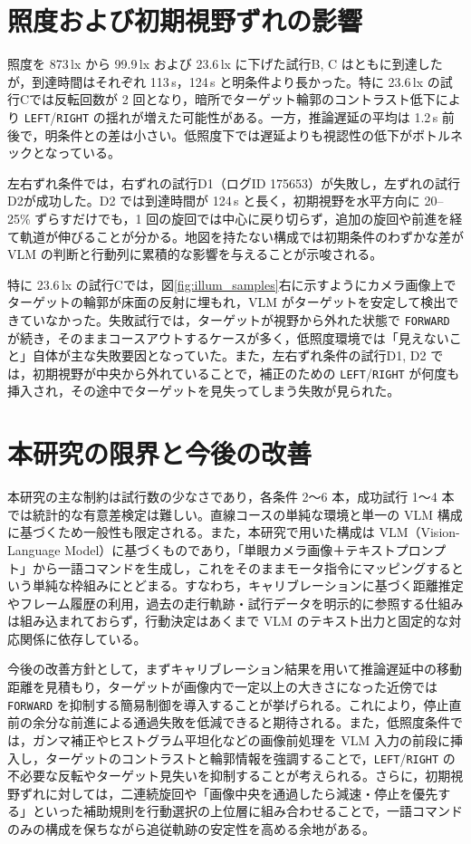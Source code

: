 \documentclass[a4paper,11pt]{ltjsreport}
\begin{document}
\section{照度および初期視野ずれの影響}
照度を 873\,lx から 99.9\,lx および 23.6\,lx に下げた試行B, C はともに到達したが，到達時間はそれぞれ 113\,s，124\,s と明条件より長かった。特に 23.6\,lx の試行Cでは反転回数が 2 回となり，暗所でターゲット輪郭のコントラスト低下により \texttt{LEFT}/\texttt{RIGHT} の揺れが増えた可能性がある。一方，推論遅延の平均は 1.2\,s 前後で，明条件との差は小さい。低照度下では遅延よりも視認性の低下がボトルネックとなっている。

左右ずれ条件では，右ずれの試行D1（ログID 175653）が失敗し，左ずれの試行D2が成功した。D2 では到達時間が 124\,s と長く，初期視野を水平方向に 20--25\% ずらすだけでも，1 回の旋回では中心に戻り切らず，追加の旋回や前進を経て軌道が伸びることが分かる。地図を持たない構成では初期条件のわずかな差が VLM の判断と行動列に累積的な影響を与えることが示唆される。

特に 23.6\,lx の試行Cでは，図\ref{fig:illum_samples}右に示すようにカメラ画像上でターゲットの輪郭が床面の反射に埋もれ，VLM がターゲットを安定して検出できていなかった。失敗試行では，ターゲットが視野から外れた状態で \texttt{FORWARD} が続き，そのままコースアウトするケースが多く，低照度環境では「見えないこと」自体が主な失敗要因となっていた。また，左右ずれ条件の試行D1, D2 では，初期視野が中央から外れていることで，補正のための \texttt{LEFT}/\texttt{RIGHT} が何度も挿入され，その途中でターゲットを見失ってしまう失敗が見られた。

\section{本研究の限界と今後の改善}
本研究の主な制約は試行数の少なさであり，各条件 2〜6 本，成功試行 1〜4 本では統計的な有意差検定は難しい。直線コースの単純な環境と単一の VLM 構成に基づくため一般性も限定される。また，本研究で用いた構成は VLM（Vision-Language Model）に基づくものであり，「単眼カメラ画像＋テキストプロンプト」から一語コマンドを生成し，これをそのままモータ指令にマッピングするという単純な枠組みにとどまる。すなわち，キャリブレーションに基づく距離推定やフレーム履歴の利用，過去の走行軌跡・試行データを明示的に参照する仕組みは組み込まれておらず，行動決定はあくまで VLM のテキスト出力と固定的な対応関係に依存している。

今後の改善方針として，まずキャリブレーション結果を用いて推論遅延中の移動距離を見積もり，ターゲットが画像内で一定以上の大きさになった近傍では \texttt{FORWARD} を抑制する簡易制御を導入することが挙げられる。これにより，停止直前の余分な前進による通過失敗を低減できると期待される。また，低照度条件では，ガンマ補正やヒストグラム平坦化などの画像前処理を VLM 入力の前段に挿入し，ターゲットのコントラストと輪郭情報を強調することで，\texttt{LEFT}/\texttt{RIGHT} の不必要な反転やターゲット見失いを抑制することが考えられる。さらに，初期視野ずれに対しては，二連続旋回や「画像中央を通過したら減速・停止を優先する」といった補助規則を行動選択の上位層に組み合わせることで，一語コマンドのみの構成を保ちながら追従軌跡の安定性を高める余地がある。
\end{document}
